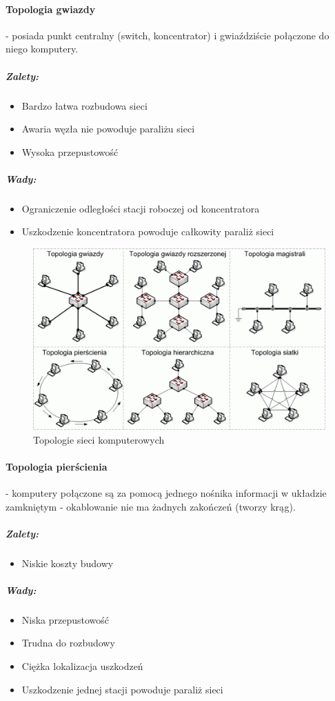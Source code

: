 \documentclass[a4paper,twoside]{report}
\begin{document}
\paragraph{Topologia gwiazdy} - posiada punkt centralny (switch, koncentrator) i gwiaździście połączone do niego komputery.
\subparagraph{Zalety:}
\begin{itemize}
\item Bardzo łatwa rozbudowa sieci
\item Awaria węzła nie powoduje paraliżu sieci
\item Wysoka przepustowość
\end{itemize}
\subparagraph{Wady:}
\begin{itemize}
\item Ograniczenie odległości stacji roboczej od koncentratora
\item Uszkodzenie koncentratora powoduje całkowity paraliż sieci
\end{itemize}


\begin{figure}[htbp]
\centering
\includegraphics[scale=1]{obrazy/topologie.png}
\caption{Topologie sieci komputerowych}
\label{rys:topologie_sieci_komp}
\end{figure}

\paragraph{Topologia pierścienia} - komputery połączone są za pomocą jednego nośnika informacji w układzie zamkniętym - okablowanie nie ma żadnych zakończeń (tworzy krąg).
\subparagraph{Zalety:}
\begin{itemize}
\item Niskie koszty budowy
\end{itemize}
\subparagraph{Wady:}
\begin{itemize}
\item Niska przepustowość
\item Trudna do rozbudowy
\item Ciężka lokalizacja uszkodzeń
\item Uszkodzenie jednej stacji powoduje paraliż sieci
\end{itemize}
\end{document}
